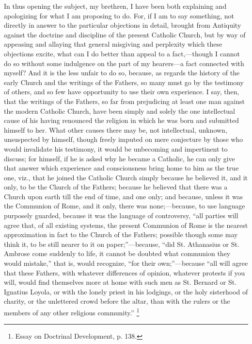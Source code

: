 In thus opening the subject, my brethren, I have been both
explaining and apologizing for what I am proposing to do. For, if I am
to say something, not directly in answer to the particular objections
in detail, brought from Antiquity against the doctrine and discipline
of the present Catholic Church, but by way of appeasing and allaying
that general misgiving and perplexity which these objections excite,
what can I do better than appeal to a fact,—though I cannot do so
without some indulgence on the part of my hearers—a fact connected
with myself? And it is the less unfair to do so, because, as regards
the history of the early Church and the writings of the Fathers, so
many must go by the testimony of others, and so few have opportunity
to use their own experience. I say, then, that the writings of the
Fathers, so far from prejudicing at least one man against the modern
Catholic Church, have been simply and solely the one intellectual
cause of his having renounced the religion in which he was born and
submitted himself to her. What other causes there may be, not
intellectual, unknown, unsuspected by himself, though freely imputed
on mere conjecture by those who would invalidate his testimony, it
would be unbecoming and impertinent to discuss; for himself, if he is
asked why he became a Catholic, he can only give that answer which
experience and consciousness bring home to him as the true one, viz.,
that he joined the Catholic Church simply because he believed it, and
it only, to be the Church of the Fathers; because he believed that
there was a Church upon earth till the end of time, and one only; and
because, unless it was the Communion of Rome, and it only, there was
none;—because, to use language purposely guarded, because it was the
language of controversy, ``all parties will agree that, of all
existing systems, the present Communion of Rome is the nearest
approximation in fact to the Church of the Fathers; possible though
some may think it, to be still nearer to it on paper;''—because,
``did St. Athanasius or St. Ambrose come suddenly to life, it
cannot be doubted what communion they would mistake,'' that is,
would recognize, ``for their own;''—because ``all will
agree that these Fathers, with whatever differences of opinion,
whatever protests if you will, would find themselves more at home with
such men as St. Bernard or St. Ignatius Loyola, or with the lonely
priest in his lodgings, or the holy sisterhood of charity, or the
unlettered crowd before the altar, than with the rulers or the members
of any other religious community.'' \footnote{Essay on Doctrinal
Development, p. 138.}

